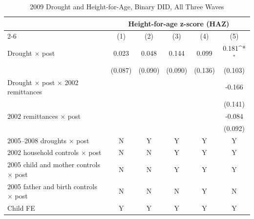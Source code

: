 \documentclass[12pt]{article}
\def\sym#1{\ifmmode^{#1}\else\(^{#1}\)\fi}
\begin{document}
\begin{longtable}{l*{5}{c}}
\caption{2009 Drought and Height-for-Age, Binary DID, All Three Waves}\\
\toprule
 & \multicolumn{5}{c}{Height-for-age z-score (HAZ)}\\
\cmidrule(lr){2-6}
            &\multicolumn{1}{c}{(1)}         &\multicolumn{1}{c}{(2)}         &\multicolumn{1}{c}{(3)}         &\multicolumn{1}{c}{(4)}         &\multicolumn{1}{c}{(5)}         \\
\midrule
Drought \ensuremath{\times} post&       0.023         &       0.048         &       0.144         &       0.099         &       0.181\sym{*}  \\
            &     (0.087)         &     (0.090)         &     (0.090)         &     (0.136)         &     (0.103)         \\
Drought \ensuremath{\times} post \ensuremath{\times} 2002 remittances&                     &                     &                     &                     &      -0.166         \\
            &                     &                     &                     &                     &     (0.141)         \\
2002 remittances \ensuremath{\times} post&                     &                     &                     &                     &      -0.084         \\
            &                     &                     &                     &                     &     (0.092)         \\
\midrule
2005--2008 droughts \ensuremath{\times} post&           N         &           Y         &           Y         &           Y         &           Y         \\
2002 household controls \ensuremath{\times} post&           N         &           N         &           Y         &           Y         &           Y         \\
2005 child and mother controls \ensuremath{\times} post&           N         &           N         &           Y         &           Y         &           Y         \\
2005 father and birth controls \ensuremath{\times} post&           N         &           N         &           N         &           Y         &           N         \\
Child FE    &           Y         &           Y         &           Y         &           Y         &           Y         \\

\end{longtable}
\end{document}
